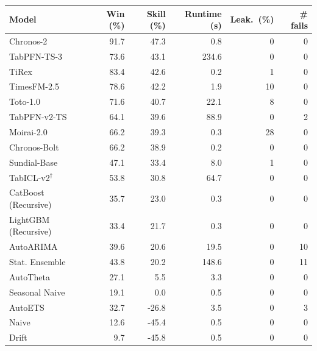 \begin{tabular}{lrrrrr}
\toprule
\textbf{Model} & \textbf{Win (\%)} & \textbf{Skill (\%)} & \textbf{Runtime (s)} & \textbf{Leak.\ (\%)} & \textbf{\# fails} \\
\midrule
Chronos-2            & 91.7 &  47.3 &   0.8 &  0 &  0 \\
\textcolor{PriorMauve}{TabPFN-TS-3}          & 73.6 &  43.1 & 234.6 &  0 &  0 \\
TiRex                & 83.4 &  42.6 &   0.2 &  1 &  0 \\
TimesFM-2.5          & 78.6 &  42.2 &   1.9 & 10 &  0 \\
Toto-1.0             & 71.6 &  40.7 &  22.1 &  8 &  0 \\
\textcolor{PriorMauve}{TabPFN-v2-TS}         & 64.1 &  39.6 &  88.9 &  0 &  2 \\
Moirai-2.0           & 66.2 &  39.3 &   0.3 & 28 &  0 \\
Chronos-Bolt         & 66.2 &  38.9 &   0.2 &  0 &  0 \\
Sundial-Base         & 47.1 &  33.4 &   8.0 &  1 &  0 \\
TabICL-v2$^{\dagger}$ & 53.8 &  30.8 &  64.7 &  0 &  0 \\
CatBoost (Recursive) & 35.7 &  23.0 &   0.3 &  0 &  0 \\
LightGBM (Recursive) & 33.4 &  21.7 &   0.3 &  0 &  0 \\
AutoARIMA            & 39.6 &  20.6 &  19.5 &  0 & 10 \\
Stat. Ensemble       & 43.8 &  20.2 & 148.6 &  0 & 11 \\
AutoTheta            & 27.1 &   5.5 &   3.3 &  0 &  0 \\
Seasonal Naive       & 19.1 &   0.0 &   0.5 &  0 &  0 \\
AutoETS              & 32.7 & -26.8 &   3.5 &  0 &  3 \\
Naive                & 12.6 & -45.4 &   0.5 &  0 &  0 \\
Drift                &  9.7 & -45.8 &   0.5 &  0 &  0 \\
\bottomrule
\end{tabular}
